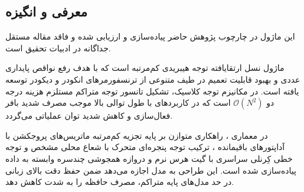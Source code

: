 \subsection{معرفی و انگیزه}
این ماژول در چارچوب پژوهش حاضر پیاده‌سازی و ارزیابی شده و فاقد مقاله مستقل جداگانه در ادبیات تحقیق است.

ماژول  نسل ارتقایافته توجه هیبریدی کم‌مرتبه است که با هدف رفع نواقص پایداری عددی و بهبود قابلیت تعمیم در طیف متنوعی از ترنسفورمرهای انکودر و دیکودر توسعه یافته است. در مکانیزم توجه کلاسیک، تشکیل تانسور توجه متراکم مستلزم هزینه درجه دو $\mathcal{O}(N^2)$ است که در کاربردهای با طول توالی بالا موجب مصرف شدید بافر فعال‌سازی و کاهش شدید توان عملیاتی می‌گردد.

در معماری ، راهکاری متوازن بر پایه تجزیه کم‌مرتبه ماتریس‌های پروجکشن با آداپتورهای باقیمانده ، ترکیب توجه پنجره‌ای متحرک با شعاع محلی مشخص و توجه خطی کِرنلی سراسری با گیت هرس نرم و دروازه همجوشی چندسره وابسته به داده پیاده‌سازی شده است. این طراحی به مدل اجازه می‌دهد ضمن حفظ دقت بالای زبانی در حد مدل‌های پایه متراکم، مصرف حافظه  را به شدت کاهش دهد.
